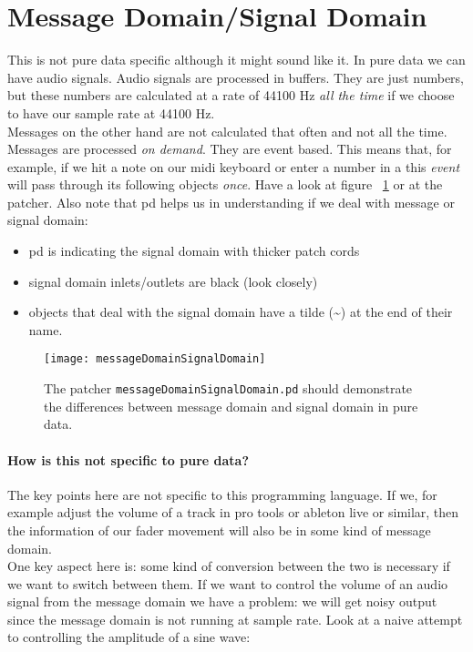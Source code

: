 \section{Message Domain/Signal Domain}
This is not pure data specific although it might sound like it.
In pure data we can have audio signals. Audio signals are processed in buffers. They are just numbers, but these numbers are calculated at a rate of 44100 Hz \textit{all the time} if we choose to have our sample rate at 44100 Hz.\\
Messages on the other hand are not calculated that often and not all the time. Messages are processed \textit{on demand}. They are event based. This means that, for example, if we hit a note on our midi keyboard or enter a number in a  this \textit{event} will pass through its following objects \textit{once}. Have a look at figure ~\ref{fig:mesSig} or at the patcher. Also note that pd helps us in understanding if we deal with message or signal domain:

\begin{itemize}
	\item pd is indicating the signal domain with thicker patch cords
	\item signal domain inlets/outlets are black (look closely)
	\item objects that deal with the signal domain have a tilde (\textasciitilde ) at the end of their name.
\end{itemize}

\begin{figure}[h!]
	\centering
	\texttt{[image: messageDomainSignalDomain]}
	\caption[message domain vs. signal domain]
	{The patcher \texttt{messageDomainSignalDomain.pd} should demonstrate the differences between message domain and signal domain in pure data.}
	\label{fig:mesSig}
\end{figure}

\paragraph{How is this not specific to pure data?} The key points here are not specific to this programming language. If we, for example adjust the volume of a track in pro tools or ableton live or similar, then the information of our fader movement will also be in some kind of message domain.\\
One key aspect here is: some kind of conversion between the two is necessary if we want to switch between them. If we want to control the volume of an audio signal from the message domain we have a problem: we will get noisy output since the message domain is not running at sample rate. Look at a naive attempt to controlling the amplitude of a sine wave:

